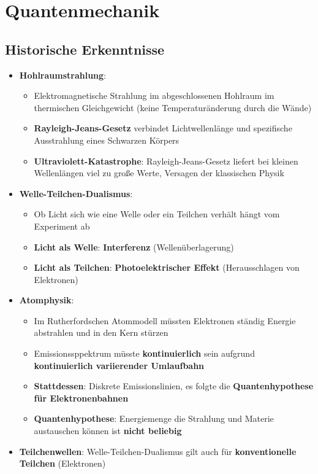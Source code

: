 \section{Quantenmechanik}%
\label{quant:sec:quantenmechanik}

\subsection{Historische Erkenntnisse}
\label{quant:sub:historische_erkenntnisse}

\begin{itemize}
	\item \textbf{Hohlraumstrahlung}:
	\begin{itemize}
		\item Elektromagnetische Strahlung im abgeschlossenen Hohlraum im thermischen Gleichgewicht (keine Temperaturänderung durch die Wände)
		\item \textbf{Rayleigh-Jeans-Gesetz} verbindet Lichtwellenlänge und spezifische Ausstrahlung eines Schwarzen Körpers
		\item \textbf{Ultraviolett-Katastrophe}: Rayleigh-Jeans-Gesetz liefert bei kleinen Wellenlängen viel zu große Werte, Versagen der klassischen Physik
	\end{itemize}
	\item \textbf{Welle-Teilchen-Dualismus}:
	\begin{itemize}
		\item Ob Licht sich wie eine Welle oder ein Teilchen verhält hängt vom Experiment ab
		\item \textbf{Licht als Welle}: \textbf{Interferenz} (Wellenüberlagerung)
		\item \textbf{Licht als Teilchen}: \textbf{Photoelektrischer Effekt} (Herausschlagen von Elektronen)
	\end{itemize}
	\item \textbf{Atomphysik}:
	\begin{itemize}
		\item Im Rutherfordschen Atommodell müssten Elektronen ständig Energie abstrahlen und in den Kern stürzen
		\item Emissionssppektrum müsste \textbf{kontinuierlich} sein aufgrund \textbf{kontinuierlich variierender Umlaufbahn}
		\item \textbf{Stattdessen}: Diskrete Emissionslinien, es folgte die \textbf{Quantenhypothese für Elektronenbahnen}
		\item \textbf{Quantenhypothese}: Energiemenge die Strahlung und Materie austauschen können ist \textbf{nicht beliebig}
	\end{itemize}
	\item \textbf{Teilchenwellen}: Welle-Teilchen-Dualismus gilt auch für \textbf{konventionelle Teilchen} (Elektronen)
\end{itemize}

